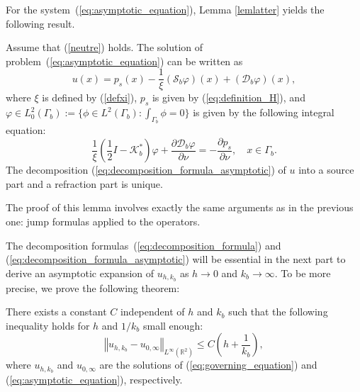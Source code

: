 For the system~(\ref{eq:asymptotic_equation}), Lemma
\ref{lemlatter} yields the following result.
\begin{lemma} \label{lemma:decomposition_lemma_asymptotic} Assume that (\ref{neutre}) holds. The solution
of problem~(\ref{eq:asymptotic_equation}) can be written as
\begin{equation}
u(x)=p_s(x)-\frac{1}{\xi}(\mathcal{S}_{b}\varphi)(x)+(\mathcal{D}_{b}\varphi)(x),
\label{eq:decomposition_formula_asymptotic}
\end{equation}
 where $\xi$ is defined by (\ref{defxi}), $p_s$ is given by (\ref{eq:definition_H}), and $\varphi\in L_0^{2}(\Gamma_{b}):= \{\phi \in L^2(\Gamma_b): \int_{\Gamma_b}
 \phi =0\}$
is given by the following integral equation:
\begin{equation} \label{eq:decomposition_formula_asymptotic2}
\frac{1}{\xi}\left(\frac{1}{2}I-\mathcal{K}_{b}^{*}\right)\varphi
+\frac{\partial\mathcal{D}_{b}\varphi}{\partial\nu}=-\frac{\partial
p_s}{\partial\nu}, \quad x \in \Gamma_b.
\end{equation}
 The decomposition (\ref{eq:decomposition_formula_asymptotic}) of $u$ into a source part and a refraction part is unique.
\end{lemma}
The proof of this lemma involves exactly the same arguments as in
the previous one: jump formulas applied to the operators.

The decomposition formulas~(\ref{eq:decomposition_formula}) and
(\ref{eq:decomposition_formula_asymptotic}) will be essential in
the next part to derive an asymptotic expansion of
$u_{h,k_{b}}$ as $h\rightarrow 0$ and $k_b\rightarrow
\infty$. To be more precise, we prove the following theorem:
\begin{theorem} \label{theorem:main-result}There exists a constant $C$
independent of $h$ and $k_{b}$ such that the following
inequality holds for $h$ and $1/k_{b}$ small enough:
\begin{equation}
\left\Vert u_{h,k_{b}}-u_{0,\infty}\right\Vert
_{L^{\infty}(\mathbb{R}^{2})}\leq
C\left(h+\frac{1}{k_{b}}\right),\label{eq:estimate-general}
\end{equation}
 where $u_{h,k_{b}}$ and $u_{0,\infty}$ are the solutions of (\ref{eq:governing_equation})
and (\ref{eq:asymptotic_equation}), respectively.
\end{theorem}


